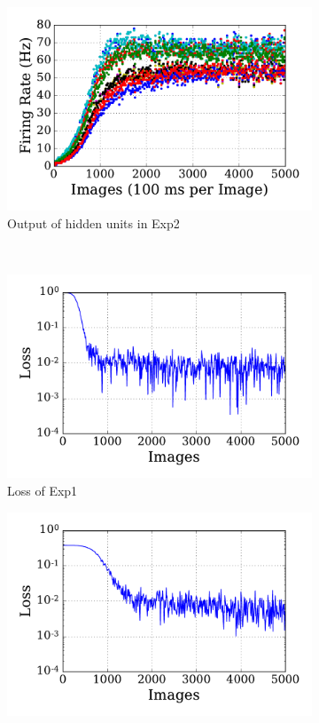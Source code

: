 \begin{figure}
\begin{subfigure}[t]{0.48\textwidth}
		\includegraphics[width=\textwidth]{pics_sdlm/00_exp_SAE_Orig/exp2_hid_s.pdf}
		\caption{Output of hidden units in Exp2}
	\end{subfigure}\\
	\begin{subfigure}[t]{0.48\textwidth}
		\includegraphics[width=\textwidth]{pics_sdlm/00_exp_SAE_Orig/exp1_mse_nons.pdf}
		\caption{Loss of Exp1}
	\end{subfigure}
	\begin{subfigure}[t]{0.48\textwidth}
		\includegraphics[width=\textwidth]{pics_sdlm/00_exp_SAE_Orig/exp2_mse_nons.pdf}

\end{subfigure}
\end{figure}
